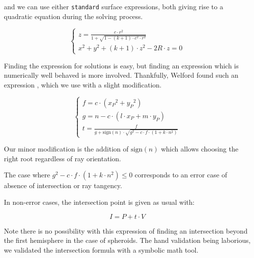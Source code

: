 and we can use either \lstinline{standard} surface expressions, both giving
rise to a quadratic equation during the solving process.

\begin{equation} \begin{cases}
z = \frac{c \cdot r^2}{1 + \sqrt{1 - (k+1) \cdot c^2 \cdot r^2}} \\
x^2 + y^2 + (k+1) \cdot z^2 - 2R \cdot z = 0
\end{cases} \end{equation}

Finding the expression for solutions is easy, but finding an expression which
is numerically well behaved is more involved. Thankfully, Welford found such
an expression \cite{Welford:1986}, which we use with a slight modification.

\begin{equation} \begin{cases}
f = c \cdot ({x_P}^2 + {y_P}^2) \\
g = n - c \cdot (l \cdot x_P + m \cdot y_P) \\
t = \frac{f}{g + \textrm{sign}(n) \cdot
             \sqrt{g^2 - c \cdot f \cdot (1 + k \cdot n^2)}}
\end{cases} \end{equation}

Our minor modification is the addition of $\textrm{sign}(n)$ which allows
choosing the right root regardless of ray orientation.

The case where $g^2 - c \cdot f \cdot (1 + k \cdot n^2) \leq 0$ corresponds
to an error case of absence of intersection or ray tangency.

In non-error cases, the intersection point is given as usual with:

\begin{equation}
I = P + t \cdot V
\end{equation}

Note there is no possibility with this expression of finding an intersection
beyond the first hemisphere in the case of spheroids. The hand validation being
laborious, we validated the intersection formula with a symbolic math tool.
